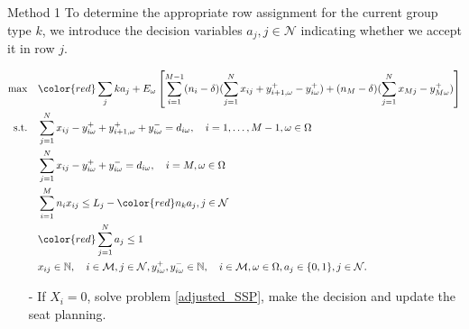   \begin{frame}{Method 1}
    \scriptsize
    To determine the appropriate row assignment for the current group type $k$, we introduce the decision variables $a_j, j \in \mathcal{N}$ indicating whether we accept it in row $j$.
    
      \begin{tiny}
        \begin{equation}\label{adjusted_SSP}
        \begin{aligned}
        \max \quad & {\color{red}\sum_{j} k a_j} + E_{\omega}\left[\sum_{i=1}^{M-1} (n_i-\delta) (\sum_{j= 1}^{N} x_{ij} + y_{i+1,\omega}^{+} - y_{i \omega}^{+}) + (n_{M}-\delta) (\sum_{j= 1}^{N} x_{Mj} - y_{M \omega}^{+})\right] \\
        \text {s.t.} \quad & \sum_{j= 1}^{N} x_{ij}-y_{i \omega}^{+}+
        y_{i+1, \omega}^{+} + y_{i \omega}^{-}=d_{i \omega}, \quad i = 1,\ldots,M-1, \omega \in \Omega \\
        & \sum_{j= 1}^{N} x_{ij} -y_{i \omega}^{+}+y_{i \omega}^{-}=d_{i \omega}, \quad i = M, \omega \in \Omega \\
        & \sum_{i=1}^{M} n_{i} x_{ij} \leq L_j - {\color{red}n_k a_j}, j \in \mathcal{N} \\
        & {\color{red}\sum_{j=1}^{N} a_j \leq 1} \\
        & x_{ij} \in \mathbb{N}, \quad i \in \mathcal{M}, j \in \mathcal{N}, y_{i \omega}^{+}, y_{i \omega}^{-} \in \mathbb{N}, \quad i \in \mathcal{M}, \omega \in \Omega,  a_j \in \{0,1\}, j \in \mathcal{N}.
        \end{aligned}
      \end{equation}
    \end{tiny}
    \begin{itemize}      
      \item[-] If $X_i = 0$, solve problem \eqref{adjusted_SSP}, make the decision and update the seat planning.
    \end{itemize}
  \end{frame}

      
      
